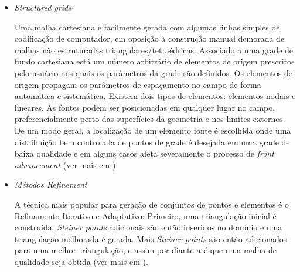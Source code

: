 \documentclass[a4paper, 12 pt]{article} %
\begin{document}
 \begin{itemize}
	\item \textit{Structured grids}
	
	\hspace{0.5cm} Uma malha cartesiana é facilmente gerada com algumas linhas simples de codificação de computador, em oposição à construção manual demorada de malhas não estruturadas triangulares/tetraédricas.
	Associado a uma grade de fundo cartesiana está um número arbitrário de elementos de origem prescritos pelo usuário nos quais os parâmetros da grade são definidos. Os elementos de origem propagam os parâmetros de espaçamento no campo de forma automática e sistemática.
	Existem dois tipos de elementos: elementos nodais e lineares. As fontes podem ser posicionadas em qualquer lugar no campo, preferencialmente perto das superfícies da geometria e nos limites externos. De um modo geral, a localização de um elemento fonte é escolhida onde uma distribuição bem controlada de pontos de grade é desejada em uma grade de baixa qualidade e em alguns casos afeta severamente o processo de \textit{front advancement} (ver mais em \citealp{pirzadeh1993structured}).
	
\end{itemize}

\begin{itemize}
	\item \textit{Métodos Refinement}
	
	\hspace{0.5cm} A técnica mais popular para geração de conjuntos de pontos e elementos é o Refinamento Iterativo e Adaptativo: Primeiro, uma triangulação inicial é construída. \textit{Steiner points} adicionais são então inseridos no domínio e uma triangulação melhorada é gerada. Mais \textit{Steiner points} são então adicionados para uma melhor triangulação, e assim por diante até que uma malha de qualidade seja obtida (ver mais em \citealp{teng2000unstructured}).
\end{itemize}
\end{document}
